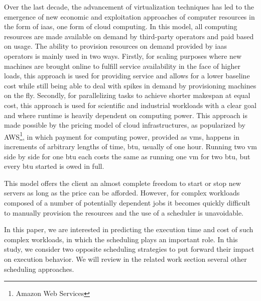 \documentclass[10pt,conference,compsocconf]{IEEEtran}
\begin{document}
Over the last decade, the advancement  of virtualization techniques has  led to
the emergence of new economic and exploitation approaches of computer resources in
the form of \ac{iaas}, one form of cloud computing. In this model, all computing
resources are made available on demand  by third-party operators and paid based
on usage.   The ability to provision  resources on demand provided  by \ac{iaas}
operators is mainly  used in two ways.  Firstly, for  scaling purposes where new
machines  are brought  online to  fulfill service  availability in  the face  of
higher loads, this approach is used for providing service and allows for a lower
baseline cost while still being able to deal with spikes in demand by provisioning
machines  on  the fly. Secondly, for  parallelizing  tasks to  achieve  shorter
makespan at  equal cost,  this approach  is used  for scientific  and industrial
workloads with a clear goal and  where runtime is heavily  dependent on computing
power.   This  approach  is  made  possible   by  the  pricing  model  of  cloud
infrastructures, as  popularized by  AWS\footnote{Amazon Web Services},  in which
payment  for computing  power, provided  as  \acp{vm}, happens  in increments of
arbitrary lengths of time, \ac{btu},  usually of  one hour. Running  two \ac{vm}
side by side for one \ac{btu} each costs the same as running one \ac{vm} for two
\ac{btu}, but every \ac{btu} started is owed in full.

This model  offers the client  an almost complete freedom  to start or  stop new
servers as  long as the  price can be  afforded. However, for  complex workloads
composed of a number of potentially  dependent jobs it becomes quickly difficult
to manually provision the resources and the use of a scheduler is unavoidable.
 
In this paper,  we are interested in  predicting the execution time  and cost of
such complex workloads, in which the scheduling plays an important role. In this
study,  we consider  two opposite  scheduling  strategies to  put forward  their
impact on execution behavior. We will review in the related work section several
other scheduling approaches.
\end{document}
